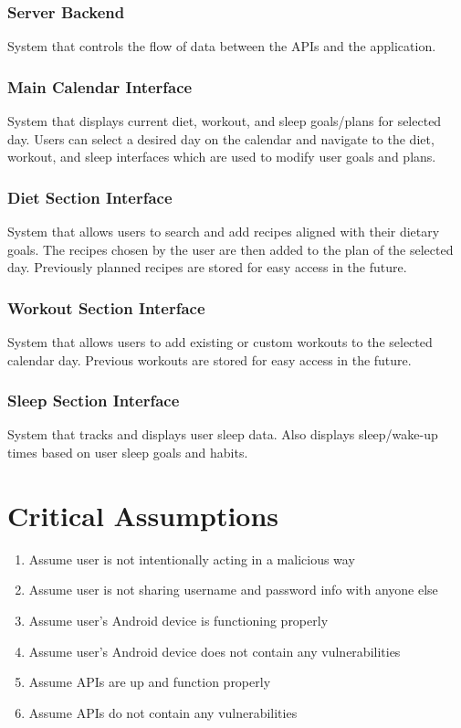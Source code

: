 \documentclass{article}
\begin{document}
\subsubsection{Server Backend}
\noindent System that controls the flow of data between the APIs and the application.

\subsubsection{Main Calendar Interface}
\noindent System that displays current diet, workout, and sleep goals/plans for selected day. Users can select a desired day on the calendar and navigate to the diet, workout, and sleep interfaces which are used to modify user goals and plans.

\subsubsection{Diet Section Interface}
\noindent System that allows users to search and add recipes aligned with their dietary goals. The recipes chosen by the user are then added to the plan of the selected day. Previously planned recipes are stored for easy access in the future.

\subsubsection{Workout Section Interface}
\noindent System that allows users to add existing or custom workouts to the selected calendar day. Previous workouts are stored for easy access in the future. 

\subsubsection{Sleep Section Interface}
\noindent System that tracks and displays user sleep data. Also displays sleep/wake-up times based on user sleep goals and habits. 

\section{Critical Assumptions}
\noindent 
\begin{enumerate}
    \item Assume user is not intentionally acting in a malicious way
    \item Assume user is not sharing username and password info with anyone else
    \item Assume user's Android device is functioning properly
    \item Assume user's Android device does not contain any vulnerabilities
    \item Assume APIs are up and function properly
    \item Assume APIs do not contain any vulnerabilities
\end{enumerate}
\end{document}
